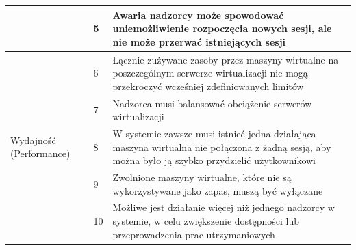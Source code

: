 \documentclass[../praca-dyplomowa.tex]{subfiles}
\begin{document}
\begin{table}[H]
\begin{tabular}{|p{}|p{}|p{}|}
                                                        & 5            & Awaria nadzorcy może spowodować uniemożliwienie rozpoczęcia nowych sesji, ale nie może przerwać istniejących sesji                                                                                                                                                                                                    \\ \hline
        \multirow[t]{10}{=}{Wydajność (Performance)}    & 6            & Łącznie zużywane zasoby przez maszyny wirtualne na poszczególnym serwerze wirtualizacji nie mogą przekroczyć wcześniej zdefiniowanych limitów                                                                                                                                                                         \\ \cline{2-3}
                                                        & 7            & Nadzorca musi balansować obciążenie serwerów wirtualizacji                                                                                                                                                                                                                                                            \\ \cline{2-3}
                                                        & 8            & W systemie zawsze musi istnieć jedna działająca maszyna wirtualna nie połączona z żadną sesją, aby można było ją szybko przydzielić użytkownikowi                                                                                                                                                                     \\ \cline{2-3}
                                                        & 9            & Zwolnione maszyny wirtualne, które nie są wykorzystywane jako zapas, muszą być wyłączane                                                                                                                                                                                                                              \\ \hline
        \multirow[t]{3}{=}{Utrzymanie (Supportability)} & 10           & Możliwe jest działanie więcej niż jednego nadzorcy w systemie, w celu zwiększenie dostępności lub przeprowadzenia prac utrzymaniowych                                                                                                                                                                                 \\
        \hline
    \end{tabular}
\end{table}
\end{document}
